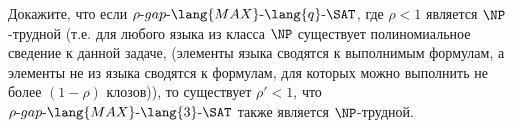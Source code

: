 Докажите, что если $\rho \text{-} gap \text{-} \lang{MAX} \text{-} \lang{q} \text{-} \SAT$, где $\rho < 1$ является
$\NP$-трудной (т.е. для любого языка из класса $\NP$ существует полиномиальное сведение к данной задаче, (элементы языка
сводятся к выполнимым формулам, а элементы не из языка сводятся к формулам, для которых можно выполнить не более $(1 - \rho)$
клозов)), то существует $\rho' < 1$, что $\rho \text{-} gap \text{-} \lang{MAX} \text{-} \lang{3} \text{-} \SAT$ также
является $\NP$-трудной.